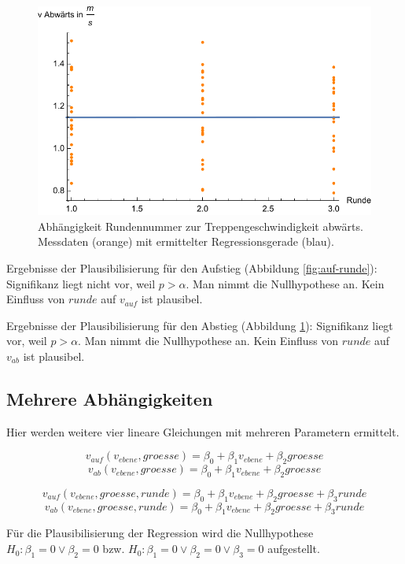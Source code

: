 \begin{figure} \centering 
	\includegraphics[]{abbildungen/regression/2017/ab-runde.pdf}
	
	\caption{Abhängigkeit Rundennummer zur Treppengeschwindigkeit abwärts. Messdaten (orange) mit ermittelter Regressionsgerade (blau). \label{fig:ab-runde}}
\end{figure}

Ergebnisse der Plausibilisierung für den Aufstieg
(Abbildung \ref{fig:auf-runde}):
Signifikanz liegt nicht vor, weil $p > \alpha$. Man nimmt die
Nullhypothese an. Kein Einfluss von $runde$ auf $v_{auf}$ ist plausibel.

Ergebnisse der Plausibilisierung für den Abstieg
(Abbildung \ref{fig:ab-runde}):
Signifikanz liegt vor, weil $p > \alpha$. Man nimmt die
Nullhypothese an. Kein Einfluss von $runde$ auf $v_{ab}$ ist plausibel.

\subsection{Mehrere Abhängigkeiten}

Hier werden weitere vier lineare Gleichungen mit mehreren Parametern ermittelt.

\[v_{auf}(v_{ebene}, groesse) = \beta_0 + \beta_1 v_{ebene} + \beta_2 groesse\]
\[v_{ab}(v_{ebene}, groesse) = \beta_0 + \beta_1 v_{ebene} + \beta_2 groesse\]

\[v_{auf}(v_{ebene}, groesse, runde) = \beta_0 + \beta_1 v_{ebene} + \beta_2 groesse + \beta_3 runde\]
\[v_{ab}(v_{ebene}, groesse, runde) = \beta_0 + \beta_1 v_{ebene} + \beta_2 groesse + \beta_3 runde\]

Für die Plausibilisierung der Regression wird die Nullhypothese 
$H_0: \beta_1 = 0  \lor \beta_2 = 0$ bzw. $H_0: \beta_1 = 0  \lor \beta_2 = 0 \lor \beta_3 = 0$ aufgestellt.

